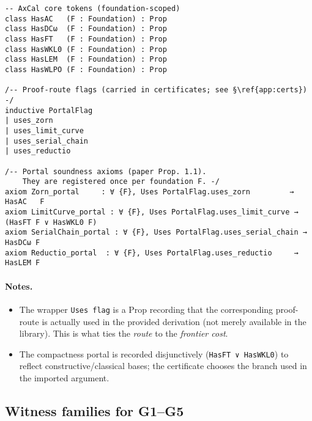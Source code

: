 \documentclass[11pt]{article}
\theoremstyle{definition}
\theoremstyle{remark}
\begin{document}
\begin{verbatim}
-- AxCal core tokens (foundation-scoped)
class HasAC   (F : Foundation) : Prop
class HasDCω  (F : Foundation) : Prop
class HasFT   (F : Foundation) : Prop
class HasWKL0 (F : Foundation) : Prop
class HasLEM  (F : Foundation) : Prop
class HasWLPO (F : Foundation) : Prop

/-- Proof-route flags (carried in certificates; see §\ref{app:certs}) -/
inductive PortalFlag
| uses_zorn
| uses_limit_curve
| uses_serial_chain
| uses_reductio

/-- Portal soundness axioms (paper Prop. 1.1). 
    They are registered once per foundation F. -/
axiom Zorn_portal     : ∀ {F}, Uses PortalFlag.uses_zorn         → HasAC   F
axiom LimitCurve_portal : ∀ {F}, Uses PortalFlag.uses_limit_curve → (HasFT F ∨ HasWKL0 F)
axiom SerialChain_portal : ∀ {F}, Uses PortalFlag.uses_serial_chain → HasDCω F
axiom Reductio_portal  : ∀ {F}, Uses PortalFlag.uses_reductio     → HasLEM F
\end{verbatim}

\paragraph{Notes.}
\begin{itemize}
\item The wrapper \verb|Uses flag| is a Prop recording that the corresponding proof-route is actually used in the provided derivation (not merely available in the library). This is what ties the \emph{route} to the \emph{frontier cost}.
\item The compactness portal is recorded disjunctively (\verb|HasFT ∨ HasWKL0|) to reflect constructive/classical bases; the certificate chooses the branch used in the imported argument.
\end{itemize}

\subsection{Witness families for G1--G5}\label{app:witnesses}
\end{document}
